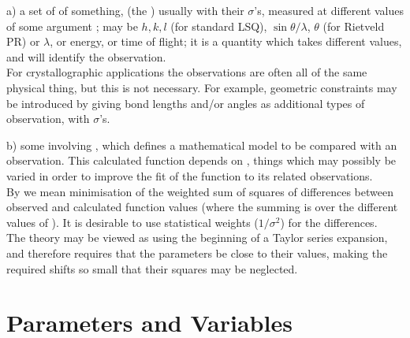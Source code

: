 \begin{list} {} {\setlength{\labelwidth}{8mm}
  \setlength{\parsep}{-1ex}
  \setlength{\leftmargin}{\labelwidth}
 \addtolength{\leftmargin}{4mm}}
\item[a) \hfill] a set of  of something, 
(the )
usually with their  $\sigma$'s,
measured at different values of some argument ;
 may be $h,k,l$ (for standard LSQ), $\sin\theta/\lambda$, 
$\theta$ (for
Rietveld PR) or $\lambda$, or energy, or time of flight; it is a
quantity which takes different values, and will identify the
observation.\\[1mm]
For crystallographic applications the observations are often all of the
same physical thing, but this is not necessary.  For example, geometric
constraints may be introduced by giving bond lengths and/or angles as
additional types of observation, with $\sigma$'s.
\item[b) \hfill]  some  involving ,
which defines a
mathematical model to be compared with an observation.  This calculated
function depends on , things which may possibly be varied in order
to improve the fit of the function to its related observations.\\[1mm]
By  we mean minimisation of the weighted sum of squares of 
differences
between observed and calculated function values (where the summing is
over the different values of ).  It is desirable to use 
statistical weights ($1/\sigma^2$)
for the differences.\\[1mm]
The theory may be viewed as using the beginning of a Taylor series
expansion, and therefore requires that the parameters be close to
their  values, making the required shifts so small that their
squares may be neglected.\end{list}
 
\section{Parameters and Variables}
% 
